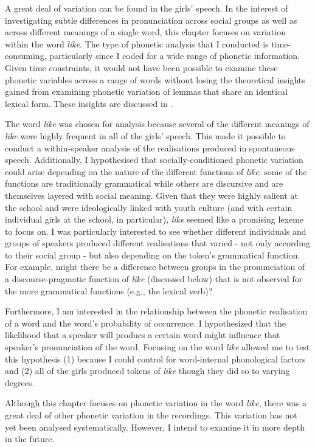 \noindent A great deal of variation can be found in the girls' speech. In the interest of investigating subtle differences in pronunciation across social groups as well as across different meanings of a single word, this chapter focuses on variation within the word \textit{like}. The type of phonetic analysis that I conducted is time-consuming, particularly since I coded for a wide range of phonetic information. Given time constraints, it would not have been possible to examine these phonetic variables across a range of words without losing the theoretical insights gained from examining phonetic variation of lemmas that share an identical lexical form. These insights are discussed in .

The word \textit{like} was chosen for analysis because several of the different meanings of \textit{like} were highly frequent in all of the girls' speech. This made it possible to conduct a within-speaker analysis of the realisations produced in spontaneous speech. Additionally, I hypothesised that socially-conditioned phonetic variation could arise depending on the nature of the different functions of \textit{like}: some of the functions are traditionally grammatical while others are discursive and are themselves layered with social meaning. Given that they were highly salient at the school and were ideologically linked with youth culture (and with certain individual girls at the school, in particular), \textit{like} seemed like a promising lexeme to focus on. I was particularly interested to see whether different individuals and groups of speakers produced different realisations that varied - not only according to their social group - but also depending on the token's grammatical function. For example, might there be a difference between groups in the pronunciation of a discourse-pragmatic function of \textit{like} (discussed below) that is not observed for the more grammatical functions (e.g., the lexical verb)? 

\largerpage
Furthermore, I am interested in the relationship between the phonetic realisation of a word and the word's probability of occurrence. I hypothesized that the likelihood that a speaker will producs a certain word might influence that speaker's pronunciation of the word. Focusing on the word \textit{like} allowed me to test this hypothesis (1) because I could control for word-internal phonological factors and (2) all of the girls produced tokens of \textit{like} though they did so to varying degrees.

Although this chapter focuses on phonetic variation in the word \textit{like}, there was a great deal of other phonetic variation in the recordings. This variation has not yet been analysed systematically. However, I intend to examine it in more depth in the future. 

